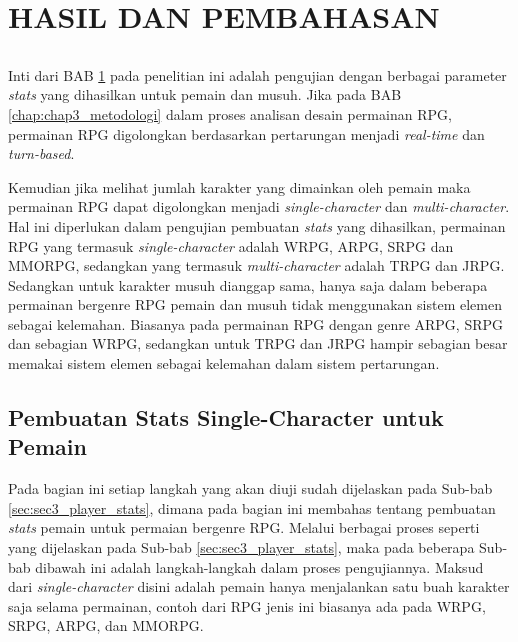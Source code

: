 \chapter{HASIL DAN PEMBAHASAN}
\label{chap:chap4_eval}
\vspace{1ex}


\section*{}
Inti dari BAB \ref{chap:chap4_eval} pada penelitian ini adalah pengujian dengan berbagai parameter \textit{stats} yang dihasilkan untuk pemain dan musuh. Jika pada BAB \ref{chap:chap3_metodologi} dalam proses analisan desain permainan RPG, permainan RPG digolongkan berdasarkan pertarungan menjadi \textit{real-time} dan \textit{turn-based}. 
\vspace{1ex}

Kemudian jika melihat jumlah karakter yang dimainkan oleh pemain maka permainan RPG dapat digolongkan menjadi \textit{single-character} dan \textit{multi-character}. Hal ini diperlukan dalam pengujian pembuatan \textit{stats} yang dihasilkan, permainan RPG yang termasuk \textit{single-character} adalah WRPG, ARPG, SRPG dan MMORPG, sedangkan yang termasuk \textit{multi-character} adalah TRPG dan JRPG. Sedangkan untuk karakter musuh dianggap sama, hanya saja dalam beberapa permainan bergenre RPG pemain dan musuh tidak menggunakan sistem elemen sebagai kelemahan. Biasanya pada permainan RPG dengan genre ARPG, SRPG dan sebagian WRPG, sedangkan untuk TRPG dan JRPG hampir sebagian besar memakai sistem elemen sebagai kelemahan dalam sistem pertarungan.
\vspace{1ex}

\section{Pembuatan Stats Single-Character untuk Pemain}
\label{sec:sec4_eval_single-character_player}
\vspace{1ex}

Pada bagian ini setiap langkah yang akan diuji sudah dijelaskan pada Sub-bab \ref{sec:sec3_player_stats}, dimana pada bagian ini membahas tentang pembuatan \textit{stats} pemain untuk permaian bergenre RPG. Melalui berbagai proses seperti yang dijelaskan pada Sub-bab \ref{sec:sec3_player_stats}, maka pada beberapa Sub-bab dibawah ini adalah langkah-langkah dalam proses pengujiannya. Maksud dari \textit{single-character} disini adalah pemain hanya menjalankan satu buah karakter saja selama permainan, contoh dari RPG jenis ini biasanya ada pada WRPG, SRPG, ARPG, dan MMORPG.
\vspace{1ex}

